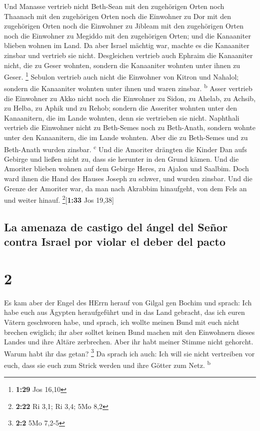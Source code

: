  Und Manasse vertrieb nicht Beth-Sean mit den zugehörigen
Orten noch Thaanach mit den zugehörigen Orten noch die Einwohner zu Dor
mit den zugehörigen Orten noch die Einwohner zu Jibleam mit den
zugehörigen Orten noch die Einwohner zu Megiddo mit den zugehörigen
Orten; und die Kanaaniter blieben wohnen im Land.  Da
aber Israel mächtig war, machte es die Kanaaniter zinsbar und vertrieb
sie nicht.  Desgleichen vertrieb auch Ephraim die
Kanaaniter nicht, die zu Geser wohnten, sondern die Kanaaniter wohnten
unter ihnen zu Geser. \footnote{\textbf{1:29} Jos 16,10} 
Sebulon vertrieb auch nicht die Einwohner von Kitron und Nahalol;
sondern die Kanaaniter wohnten unter ihnen und waren zinsbar.
\textsuperscript{b}  Asser vertrieb die Einwohner zu Akko
nicht noch die Einwohner zu Sidon, zu Ahelab, zu Achsib, zu Helba, zu
Aphik und zu Rehob;  sondern die Asseriter wohnten unter
den Kanaanitern, die im Lande wohnten, denn sie vertrieben sie nicht.
 Naphthali vertrieb die Einwohner nicht zu Beth-Semes
noch zu Beth-Anath, sondern wohnte unter den Kanaanitern, die im Lande
wohnten. Aber die zu Beth-Semes und zu Beth-Anath wurden zinsbar.
\textsuperscript{c}  Und die Amoriter drängten die Kinder
Dan aufs Gebirge und ließen nicht zu, dass sie herunter in den Grund
kämen.  Und die Amoriter blieben wohnen auf dem Gebirge
Heres, zu Ajalon und Saalbim. Doch ward ihnen die Hand des Hauses Joseph
zu schwer, und wurden zinsbar.  Und die Grenze der
Amoriter war, da man nach Akrabbim hinaufgeht, von dem Fels an und
weiter hinauf. \footnote{\textbf{2:22} Ri 3,1; Ri 3,4; 5Mo 8,2}{[}\textbf{1:33}
Jos 19,38{]}

\hypertarget{la-amenaza-de-castigo-del-uxe1ngel-del-seuxf1or-contra-israel-por-violar-el-deber-del-pacto}{%
\subsection{La amenaza de castigo del ángel del Señor contra Israel por
violar el deber del
pacto}\label{la-amenaza-de-castigo-del-uxe1ngel-del-seuxf1or-contra-israel-por-violar-el-deber-del-pacto}}

\hypertarget{section-1}{%
\section{2}\label{section-1}}

 Es kam aber der Engel des HErrn herauf von Gilgal gen
Bochim und sprach: Ich habe euch aus Ägypten heraufgeführt und in das
Land gebracht, das ich euren Vätern geschworen habe, und sprach, ich
wollte meinen Bund mit euch nicht brechen ewiglich;  ihr
aber solltet keinen Bund machen mit den Einwohnern dieses Landes und
ihre Altäre zerbrechen. Aber ihr habt meiner Stimme nicht gehorcht.
Warum habt ihr das getan? \footnote{\textbf{2:2} 5Mo 7,2-5}
 Da sprach ich auch: Ich will sie nicht vertreiben vor
euch, dass sie euch zum Strick werden und ihre Götter zum Netz.
\textsuperscript{b}

